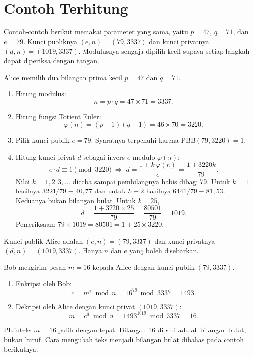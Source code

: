 \section{Contoh Terhitung}
\label{sec:contoh-rsa}

Contoh-contoh berikut memakai parameter yang sama, yaitu $p = 47$, $q = 71$,
dan $e = 79$. Kunci publiknya $(e, n) = (79, 3337)$ dan kunci privatnya
$(d, n) = (1019, 3337)$. Modulusnya sengaja dipilih kecil supaya setiap
langkah dapat diperiksa dengan tangan.

\begin{example}
\label{ex:rsa-kunci}
Alice memilih dua bilangan prima kecil $p = 47$ dan $q = 71$.
\begin{enumerate}
    \item Hitung modulus:
    \[ n = p \cdot q = 47 \times 71 = 3337. \]
    \item Hitung fungsi Totient Euler:
    \[ \varphi(n) = (p-1)(q-1) = 46 \times 70 = 3220. \]
    \item Pilih kunci publik $e = 79$. Syaratnya terpenuhi karena
          $\text{PBB}(79, 3220) = 1$.
    \item Hitung kunci privat $d$ sebagai invers $e$ modulo $\varphi(n)$:
    \[ e \cdot d \equiv 1 \pmod{3220}
       \;\Longrightarrow\; d = \frac{1 + k\,\varphi(n)}{e}
       = \frac{1 + 3220k}{79}. \]
    Nilai $k = 1, 2, 3, \dots$ dicoba sampai pembilangnya habis dibagi 79.
    Untuk $k = 1$ hasilnya $3221/79 = 40{,}77$ dan untuk $k = 2$ hasilnya
    $6441/79 = 81{,}53$. Keduanya bukan bilangan bulat. Untuk $k = 25$,
    \[ d = \frac{1 + 3220 \times 25}{79} = \frac{80501}{79} = 1019. \]
    Pemeriksaan: $79 \times 1019 = 80501 = 1 + 25 \times 3220$.
\end{enumerate}
Kunci publik Alice adalah $(e, n) = (79, 3337)$ dan kunci privatnya
$(d, n) = (1019, 3337)$. Hanya $n$ dan $e$ yang boleh disebarkan.
\end{example}

\begin{example}
Bob mengirim pesan $m = 16$ kepada Alice dengan kunci publik $(79, 3337)$.
\begin{enumerate}
    \item Enkripsi oleh Bob:
    \[ c = m^e \bmod n = 16^{79} \bmod 3337 = 1493. \]
    \item Dekripsi oleh Alice dengan kunci privat $(1019, 3337)$:
    \[ m = c^d \bmod n = 1493^{1019} \bmod 3337 = 16. \]
\end{enumerate}
Plainteks $m = 16$ pulih dengan tepat. Bilangan 16 di sini adalah bilangan
bulat, bukan huruf. Cara mengubah teks menjadi bilangan bulat dibahas pada
contoh berikutnya.
\end{example}

